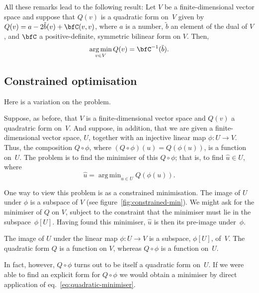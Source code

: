 \documentclass[10pt, a4paper]{article}
\DeclareMathOperator*{\argmin}{arg\,min}
\begin{document}
All these remarks lead to the following result: Let $V$ be a
finite-dimensional vector space and suppose that $Q(v)$ is a quadratic
form on~$V$ given by $Q(v)=a -2\tilde{b}(v) + \bfC(v,v)$, where
$a$ is a number, $\tilde{b}$ an element of the dual of $V$, and
$\bfC$ a positive-definite, symmetric bilinear form on $V$. Then,
\begin{equation}
  \argmin_{v\in V} Q(v) = \bfC^{-1}(\tilde{b}).
  \label{eq:quadratic-minimiser}
\end{equation}

\subsection*{Constrained optimisation}
Here is a variation on the problem.

Suppose, as before, that $V$ is a finite-dimensional vector space and
$Q(v)$ a quadratric form on~$V$. And suppose, in addition, that we are
given a finite-dimensional vector space, $U$, together with an
injective linear map $\phi:U\to V$. Thus, the composition
$Q\circ\phi$, where $(Q\circ\phi)(u)=Q(\phi(u))$, is a function
on~$U$. The problem is to find the minimiser of this $Q\circ\phi$; that is,
to find $\hat{u}\in U$, where
\begin{equation}
  \hat{u} = \argmin_{u\in U} Q(\phi(u)).
\end{equation}

One way to view this problem is as a constrained minimisation. The
image of $U$ under $\phi$ is a subspace of $V$ (see
figure~\ref{fig:constrained-min}). We might ask for the minimiser of
$Q$ on $V$, subject to the constraint that the minimiser must lie in
the subspace~$\phi[U]$. Having found this minimiser, $\hat{u}$ is then
its pre-image under~$\phi$.
\begin{marginfigure}
  \begin{center}
  \end{center}
  \caption{The image of $U$ under the linear map $\phi:U\to V$ is a
    subspace, $\phi[U]$, of~$V$. The quadratic form $Q$ is a function on
    $V$, whereas $Q\circ\phi$ is a function
    on~$U$.\label{fig:constrained-min}}
\end{marginfigure}

In fact, however, $Q\circ\phi$ turns out to be itself a quadratic form
on~$U$. If we were able to find an explicit form for $Q\circ\phi$ we would
obtain a minimiser by direct application of
eq.~\eqref{eq:quadratic-minimiser}.
\end{document}
